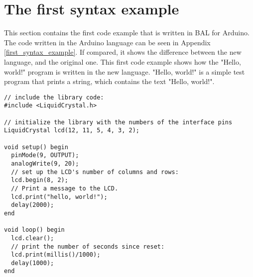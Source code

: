 \section{The first syntax example}\label{sec:code_examples}
This section contains the first code example that is written in BAL for Arduino. The code written in the Arduino language can be seen in Appendix \ref{first_syntax_example}. If compared, it shows the difference between the new language, and the original one. This first code example shows how the "Hello, world!" program is written in the new language. "Hello, world!" is a simple test program that prints a string, which contains the text "Hello, world!".
 
\begin{lstlisting}[caption=Hello World code example based on the source language, label=lst:syntax1]
// include the library code:
#include <LiquidCrystal.h>

// initialize the library with the numbers of the interface pins
LiquidCrystal lcd(12, 11, 5, 4, 3, 2);

void setup() begin
  pinMode(9, OUTPUT);
  analogWrite(9, 20);
  // set up the LCD's number of columns and rows: 
  lcd.begin(8, 2);
  // Print a message to the LCD.
  lcd.print("hello, world!");
  delay(2000);
end

void loop() begin
  lcd.clear();
  // print the number of seconds since reset:
  lcd.print(millis()/1000);
  delay(1000);
end
\end{lstlisting}
